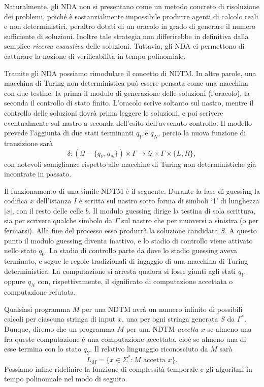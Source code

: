\documentclass[10pt]{\classname}
\theoremstyle{newlinethm}
\theoremstyle{theorem}
\theoremstyle{definition}
\theoremstyle{definition}
\theoremstyle{definition}
\theoremstyle{definition}
\begin{document}
Naturalmente, gli NDA non si presentano come un metodo concreto di risoluzione dei problemi, poiché è sostanzialmente impossibile produrre agenti di calcolo reali e non deterministici, peraltro dotati di un oracolo in grado di generare il numero sufficiente di soluzioni. Inoltre tale strategia non differirebbe in definitiva dalla semplice \emph{ricerca esaustiva} delle soluzioni. Tuttavia, gli NDA ci permettono di catturare la nozione di verificabilità in tempo polinomiale.

Tramite gli NDA possiamo rimodulare il concetto di NDTM. In altre parole, una macchina di Turing non deterministica può essere pensata come una macchina con due testine: la prima il modulo di generazione delle soluzioni (l'oracolo), la seconda il controllo di stato finito. L'oracolo scrive soltanto sul nastro, mentre il controllo delle soluzioni dovrà prima leggere le soluzioni, e poi scrivere eventualmente sul nastro a seconda dell'esito dell'avvenuto controllo. Il modello prevede l'aggiunta di due stati terminanti $q_Y$ e $q_N$, percio la nuova funzione di transizione sarà \[\delta:(\mathcal Q - \{q_Y, q_N\}) \times \Gamma \rightarrow \mathcal Q \times \Gamma \times \{L, R\},\] con notevoli somiglianze rispetto alle macchine di Turing non deterministiche già incontrate in passato.

Il funzionamento di una simile NDTM è il seguente. Durante la fase di guessing la codifica $x$ dell'istanza $I$ è scritta sul nastro sotto forma di simboli `1' di lunghezza $|x|$, con il resto delle celle $b$. Il modulo guessing dirige la testina di sola scrittura, sia per scrivere qualche simbolo da $\Gamma$ sul nastro che per muoversi a sinistra (o per fermarsi). Alla fine del processo esso produrrà la soluzione candidata $S$. A questo punto il modulo guessing diventa inattivo, e lo stadio di controllo viene attivato nello stato $q_0$. Lo stadio di controllo parte da dove lo stadio guessing aveva terminato, e segue le regole tradizionali di ingaggio di una macchina di Turing deterministica. La computazione si arresta qualora si fosse giunti agli stati $q_Y$ oppure $q_N$ con, rispettivamente, il significato di computazione accettata o computazione refutata.

Qualsiasi programma $M$ per una NDTM avrà un numero infinito di possibili calcoli per ciascuna stringa di input $x$, una per ogni stringa generata $S$ da $\Gamma^*$. Dunque, diremo che un programma $M$ per una NDTM \emph{accetta $x$} se almeno una fra queste computazione è una computazione accettata, cioè se almeno una di esse termina con lo stato $q_Y$. Il relativo linguaggio riconosciuto da $M$ sarà \[L_M = \{x \in \Sigma^*: M \mbox{ accetta } x\}.\] Possiamo infine ridefinire la funzione di complessità temporale e gli algoritmi in tempo polinomiale nel modo di seguito.
\end{document}
